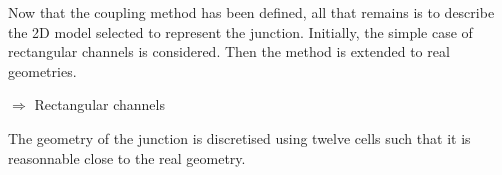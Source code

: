 \hspace*{1cm}

Now that the coupling method has been defined, all that remains is to describe the 2D model selected to represent the junction. Initially, the simple case of rectangular channels is considered. Then the method is extended to real geometries.

\vspace{0.5cm}

$\Longrightarrow$ Rectangular channels

\vspace{0.5cm}

The geometry of the junction is discretised using twelve cells such that it is reasonnable close to the real geometry.

\vspace{0.5cm}


